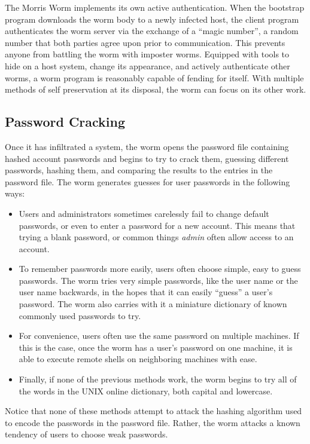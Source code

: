 The Morris Worm implements its own active authentication.
When the bootstrap program downloads the worm body to a newly infected host, the client
program authenticates the worm server via the exchange of a ``magic number'', a
random number that both parties agree upon prior to communication. 
This prevents anyone from battling the worm with imposter worms. Equipped with
tools to hide on a host system, change its appearance, and actively authenticate
other worms, a worm program is reasonably capable of fending for itself.  With
multiple methods of self preservation at its disposal, the worm can focus on
its other work.

\subsection*{Password Cracking}
Once it has infiltrated a system, the worm opens the password file
containing hashed account passwords and begins to try to crack them, guessing
different passwords, hashing them, and comparing the results to the entries in
the password file. The worm generates guesses for user passwords in the
following ways:
\begin{itemize}
\item Users and administrators sometimes carelessly fail to change
default passwords, or even to enter a password for a new account. This means
that trying a blank password, or common things \textit{admin} often allow access
to an account.
\item To remember passwords more easily, users often choose simple, easy to
guess passwords. The worm tries very simple passwords, like the user name or the
user name backwards, in the hopes that it can easily ``guess'' a user's
password. The worm also carries with it a miniature dictionary of
known commonly used passwords to try.
\item For convenience, users often use the same password on multiple
machines. If this is the case, once the worm has a user's password on one
machine, it is able to execute remote shells on neighboring machines with ease.
\item Finally, if none of the previous methods work, the worm begins to try all
of the words in the UNIX online dictionary, both capital and lowercase.
\end{itemize}
Notice that none of these methods attempt to attack the hashing algorithm used
to encode the passwords in the password file. Rather, the worm attacks a known
tendency of users to choose weak passwords.



